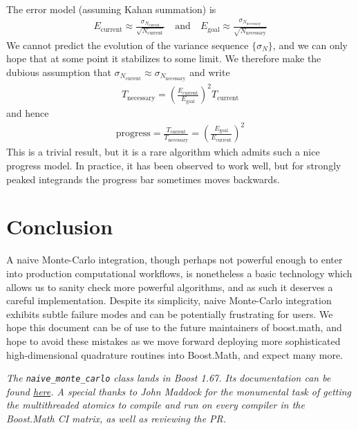 \documentclass{ansarticle}
\begin{document}
The error model (assuming Kahan summation) is
\begin{align*}
E_{\mathrm{current}} \approx \frac{\sigma_{N_{\mathrm{current}}}}{\sqrt{N_{\mathrm{current}}}}
\quad \mathrm{and} \quad
E_{\mathrm{goal}} \approx \frac{\sigma_{N_{\mathrm{necessary}}}}{\sqrt{N_{\mathrm{necessary}}}}
\end{align*}
We cannot predict the evolution of the variance sequence $\{\sigma_{N}\}$, and we can only hope that at some point it stabilizes to some limit.
We therefore make the dubious assumption that $\sigma_{N_{\mathrm{current}}} \approx \sigma_{N_{\mathrm{necessary}}}$ and write
\begin{align*}
T_{\mathrm{necessary}} = \left( \frac{E_{\mathrm{current}}}{E_{\mathrm{goal}}} \right)^{2}T_{\mathrm{current}}
\end{align*}
and hence
\begin{align*}
\mathrm{progress} = \frac{T_{\mathrm{current}}}{T_{\mathrm{necessary}}} = \left( \frac{E_{\mathrm{goal}}}{E_{\mathrm{current}}} \right)^{2}
\end{align*}
This is a trivial result, but it is a rare algorithm which admits such a nice progress model.
In practice, it has been observed to work well, but for strongly peaked integrands the progress bar sometimes moves backwards.

\section{Conclusion}

A naive Monte-Carlo integration, though perhaps not powerful enough to enter into production computational workflows, is nonetheless a basic technology which allows us to sanity check more powerful algorithms, and as such it deserves a careful implementation.
Despite its simplicity, naive Monte-Carlo integration exhibits subtle failure modes and can be potentially frustrating for users.
We hope this document can be of use to the future maintainers of boost.math, and hope to avoid these mistakes as we move forward deploying more sophisticated high-dimensional quadrature routines into Boost.Math, and expect many more.



\emph{The \texttt{naive_monte_carlo} class lands in Boost 1.67. Its documentation can be found \href{http://www.boost.org/doc/libs/1_67_0/libs/math/doc/html/quadrature.html}{here}. A special thanks to John Maddock for the monumental task of getting the multithreaded atomics to compile and run on every compiler in the Boost.Math CI matrix, as well as reviewing the PR.}



\end{document}
